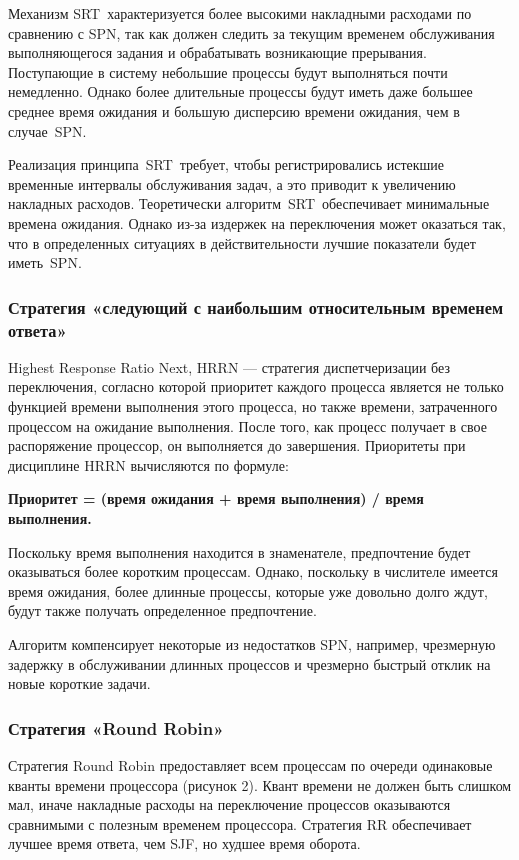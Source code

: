 Механизм SRT характеризуется более высокими накладными расходами по сравнению с SPN, так как должен следить за текущим временем обслуживания выполняющегося задания и обрабатывать возникающи­е прерывания. Поступающие в систему небольшие процессы будут выполняться почти немедленно. Однако более длительные процессы будут иметь даже большее среднее время ожидания и большую дисперсию времени ожидания, чем в случае SPN.

Реализация принципа SRT требует, чтобы­ регистрировались истекшие временные интервалы обслуживания задач, а это при­вод­ит к увеличению накладных расходов. Теоретически алгоритм SRT обеспечивает минимальные времена ожидания. Однако из­-за издержек на переключения может оказаться так, что в определенных ситуациях в действительности лучшие показатели будет иметь SPN.

\subsubsection{Стратегия «следующий с наибольшим относительным временем ответа»}
Highest Response Ratio Next, HRRN — стратегия диспетчеризации без переключения, согласно которой приоритет каждого процесса является не только функцией времени выполнения этого процесса, но также времени, затраченного процессом на ожидание выполнения. После того, как процесс получает в свое распоряжение процессор, он выполняется до завершения. Приоритеты при дисциплине HRRN­ вычисляются по формуле:

\textbf{Приоритет = (время ожидания + время выполнения) / время выполнения.}

Поскольку время выполнения находится в знаменателе, предпочтение будет оказываться более коротким процессам. Однако, поскольку в числителе имеется время ожидания, более длинные процессы, которые уже довольно долго ждут, будут также получать определенное предпочтение.

Алгоритм компенсирует некоторые из недостатков SPN, например, чрезмерную задержку в обслуживании длинных процессов и чрезмерно быстрый отклик на новые короткие задачи.

\subsubsection{Стратегия «Round Robin»}
Стратегия Round Robin предоставляет всем процессам по очереди одинаковые кванты времени процессора (рисунок 2). Квант времени не должен быть слишком мал, иначе накладные расходы на переключение процессов оказываются сравнимыми с полезным временем процессора. Стратегия RR обеспечивает лучшее время ответа, чем SJF, но худшее время оборота.

